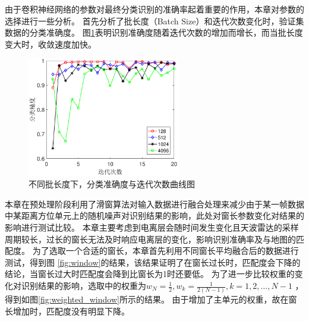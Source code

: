 由于卷积神经网络的参数对最终分类识别的准确率起着重要的作用，本章对参数的选择进行一些分析。
首先分析了批长度（Batch Size）和迭代次数变化时，验证集数据的分类准确度。
图\ref{fig:epoch}表明识别准确度随着迭代次数的增加而增长，而当批长度变大时，收敛速度加快。
\begin{figure}[hbt]
	\centering
	\includegraphics[width=6.67cm]{figures/othr/epoch}
	\caption{不同批长度下，分类准确度与迭代次数曲线图}
	\label{fig:epoch}
\end{figure}

本章在预处理阶段利用了滑窗算法对输入数据进行融合处理来减少由于某一帧数据中某距离方位单元上的随机噪声对识别结果的影响，此处对窗长参数变化对结果的影响进行测试比较。
本章主要考虑到电离层会随时间发生变化且天波雷达的采样周期较长，过长的窗长无法及时响应电离层的变化，影响识别准确率及与地图的匹配度。
为了选取一个合适的窗长，本章首先利用不同窗长平均融合后的数据进行测试，得到图 \ref{fig:window}的结果，该结果证明了在窗长过长时，匹配度会下降的结论，当窗长过大时匹配度会降到比窗长为1时还要低。
为了进一步比较权重的变化对识别结果的影响，选取中的权重为$w_N=\frac{1}{2},w_k=\frac{1}{2(N-1)},k=1,2,\dots,N-1$
，得到如图\ref{fig:weighted_window}所示的结果。
由于增加了主单元的权重，故在窗长增加时，匹配度没有明显下降。

